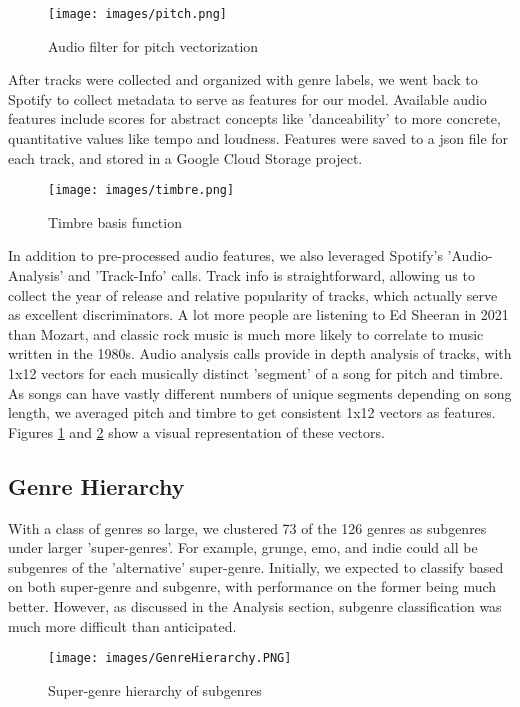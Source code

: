 \documentclass[conference]{IEEEtran}
\begin{document}
\begin{figure}[htbp]
\centerline{\texttt{[image: images/pitch.png]}}
\caption{Audio filter for pitch vectorization \cite{b6}}
\label{fig:pitch}
\end{figure}

After tracks were collected and organized with genre labels, we went back to Spotify to collect metadata to serve as features for our model. Available audio features include scores for abstract concepts like 'danceability' to more concrete, quantitative values like tempo and loudness. Features were saved to a json file for each track, and stored in a Google Cloud Storage project. 

\begin{figure}[htbp]
\centerline{\texttt{[image: images/timbre.png]}}
\caption{Timbre basis function \cite{b6}}
\label{fig:timbre}
\end{figure}

In addition to pre-processed audio features, we also leveraged Spotify's 'Audio-Analysis' and 'Track-Info' calls. Track info is straightforward, allowing us to collect the year of release and relative popularity of tracks, which actually serve as excellent discriminators. A lot more people are listening to Ed Sheeran in 2021 than Mozart, and classic rock music is much more likely to correlate to music written in the 1980s. Audio analysis calls provide in depth analysis of tracks, with 1x12 vectors for each musically distinct 'segment' of a song for pitch and timbre. As songs can have vastly different numbers of unique segments depending on song length, we averaged pitch and timbre to get consistent 1x12 vectors as features. Figures \ref{fig:pitch} and \ref{fig:timbre} show a visual representation of these vectors.

\subsection{Genre Hierarchy}

With a class of genres so large, we clustered 73 of the 126 genres as subgenres under larger 'super-genres'. For example, grunge, emo, and indie could all be subgenres of the 'alternative' super-genre. Initially, we expected to classify based on both super-genre and subgenre, with performance on the former being much better. However, as discussed in the Analysis section, subgenre classification was much more difficult than anticipated. 

\begin{figure}[htbp]
\centerline{\texttt{[image: images/GenreHierarchy.PNG]}}
\caption{Super-genre hierarchy of subgenres}
\label{fig:GenreHierarchy}
\end{figure}
\end{document}
